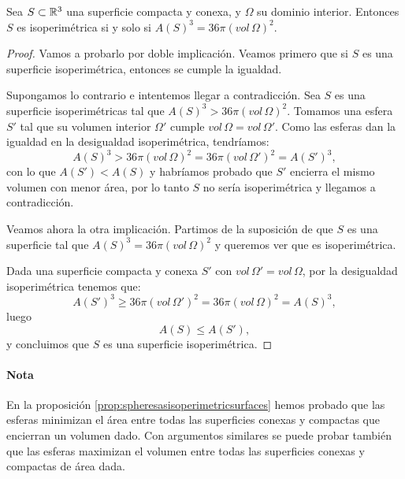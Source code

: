 \begin{corolario}\label{cor2}
Sea $S \subset \mathbb{R}^3$ una superficie compacta y conexa, y $\Omega$ su dominio interior. Entonces $S$ es isoperimétrica si y solo si $A(S)^3 = 36\pi (vol \, \Omega)^2$.
\end{corolario}
\begin{proof}
Vamos a probarlo por doble implicación. Veamos primero que si $S$ es una superficie isoperimétrica, entonces se cumple la igualdad.

Supongamos lo contrario e intentemos llegar a contradicción. Sea $S$ es una superficie isoperimétricas tal que $A(S)^3 > 36\pi (vol \, \Omega)^2$. Tomamos una esfera $S'$ tal que su volumen interior $\Omega'$ cumple $vol \, \Omega = vol \, \Omega'$. Como las esferas dan la igualdad en la desigualdad isoperimétrica, tendríamos:
%
\begin{equation*}
    A(S)^3 > 36\pi (vol \, \Omega)^2 = 36\pi (vol \, \Omega')^2 = A(S')^3,
\end{equation*}
%
con lo que $A(S') < A(S)$ y habríamos probado que $S'$ encierra el mismo volumen con menor área, por lo tanto $S$ no sería isoperimétrica y llegamos a contradicción.

Veamos ahora la otra implicación. Partimos de la suposición de que $S$ es una superficie tal que $A(S)^3 = 36\pi (vol \, \Omega)^2$ y queremos ver que es isoperimétrica.

Dada una superficie compacta y conexa $S'$ con $vol \, \Omega' = vol \, \Omega$, por la desigualdad isoperimétrica tenemos que:
%
\begin{equation*}
    A(S')^3 \geq 36\pi (vol \, \Omega')^2 = 36\pi(vol \, \Omega)^2 = A(S)^3,
\end{equation*}
%
luego
%
\begin{equation*}
    A(S) \leq A(S'),
\end{equation*}
%
y concluimos que $S$ es una superficie isoperimétrica.
\end{proof}

\paragraph{Nota}{En la proposición \ref{prop:spheresasisoperimetricsurfaces} hemos probado que las esferas minimizan el área entre todas las superficies conexas y compactas que encierran un volumen dado. Con argumentos similares se puede probar también que las esferas maximizan el volumen entre todas las superficies conexas y compactas de área dada.}

